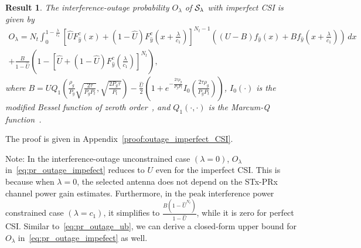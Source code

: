 \documentclass[12pt,draftcls,peerreview,onecolumn]{IEEEtran}
\newtheorem{result}{{\bf Result}}
\newcommand{\lam}{\lambda}
\newcommand{\Nt}{{N_t}}
\newcommand{\Nr}{{N_r}}
\newcommand{\Pt}{{P_t}}
\newcommand{\itau}{\tau}
\newcommand{\cone}{c_{1}}
\newcommand{\ctwo}{c_{2}}
\newcommand{\out}{O}
\newcommand{\lambym}{\frac{\lam}{\cone}}
\newcommand{\al}{\ctwo}
\newcommand{\snr}{\Omega}
\newcommand{\un}{U}
\newcommand{\callamrule}{{\cal S_{{\lam}}}}
\newcommand{\outlam}{\out_{\lam}}
\newcommand{\unhat}{\widehat{\un}}
\newcommand{\snrhat}{\widehat{\snr}}
\newcommand{\gpilotpower}{P_g}
\newcommand{\yhat}{\hat{y}}
\newcommand{\Probglt}{B}
\newcommand{\albysnrhat}[1][]{\frac{\al#1}{\snrhat}}
\newcommand{\rhog}{\rho_g}
\begin{document}
\begin{result}
\label{thm:outage_imperfect_CSI}
  The interference-outage probability $\outlam$ of $\callamrule$ with imperfect CSI is given by
\begin{multline}
\label{eq:pr_outage_impefect} 
\!\outlam \!=\! \Nt \!\int_{0}^{1-\lambym} 	
\!\left[ \unhat F_{\yhat}^{c}\left(x\right) + \left(1 -\unhat\right)F_{\yhat}^{c}\left(x+\lambym\right)\right]^{\Nt-1}\!\! \left(\! (\un - \Probglt) f_{\yhat}\left(x\right)  \!+\!  \Probglt f_{\yhat}\!\left(\! x+\lambym\right) \!\right)\, dx\\
+ \frac{ \Probglt}{1 - \unhat} \left( 1 - \left[\unhat + \left(1 -\unhat\right)F_{\yhat}^{c}\left(\lambym\right)  \right]^{\Nt}  \right),
\end{multline}
%
%
where  $\Probglt \!=\! \un  Q_1\!\left(\frac{\rhog}{ \gpilotpower} \sqrt{\frac{2\itau}{ \gpilotpower\Pt}},\sqrt{\frac{2 \gpilotpower\itau}{\Pt}}\right) \! - \frac{\unhat}{2} \left(\! 1 + e^{-\frac{2\itau\rhog}{ \gpilotpower\Pt}}I_{0}\!\left(\frac{2\itau\rhog}{ \gpilotpower\Pt} \right) \!\right)$, $I_{0}(\cdot)$ is the modified Bessel function of zeroth order~\cite[(8.406.3)]{gradshteyn00_book}, and  $Q_1(\cdot,\cdot)$ is the Marcum-Q function~\cite[(4.34)]{simon_alouini_book}.  %
\end{result}
%
\begin{IEEEproof}
	The proof is given in Appendix~\ref{proof:outage_imperfect_CSI}.
\end{IEEEproof}
%

Note: In the interference-outage unconstrained case $\left(\lam=0\right)$, $\outlam$ in~\eqref{eq:pr_outage_impefect} reduces to $\un$ even for the imperfect CSI. This is because when $\lam=0$, the selected  antenna does not depend on the  STx-PRx channel power gain estimates. Furthermore, in the peak interference power constrained case $\left(\lam=\cone\right)$, it simplifies to $\frac{ \Probglt \left( 1-\unhat^{\Nt}\right) }{1-\unhat}$, while it is zero for perfect CSI. Similar to~\eqref{eq:pr_outage_ub}, we can derive a closed-form upper bound for $\outlam$ in~\eqref{eq:pr_outage_impefect} as well.
\end{document}

